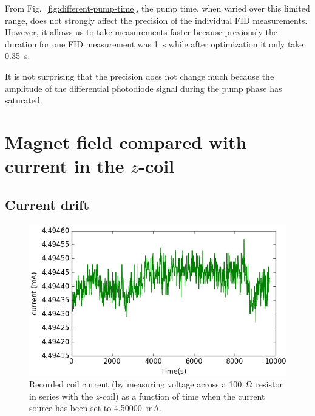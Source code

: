 From Fig.~\ref{fig:different-pump-time}, the pump time, when varied
over this limited range, does not strongly affect the precision of the
individual FID measurements.  However, it allows us to take
measurements faster because previously the duration for one FID
measurement was 1~s while after optimization it only take 0.35~s.

It is not surprising that the precision does not change much because
the amplitude of the differential photodiode signal during the pump
phase has saturated.



\section{Magnet field compared with current in the $z$-coil}

\subsection{Current drift\label{sec:current-drift}}

\begin{figure}%
\centering
\includegraphics[width=0.7\linewidth]{figures/current}
\caption{Recorded coil current (by measuring voltage across a
  100~$\ohm$ resistor in series with the $z$-coil) as a function of
  time when the current source has been set to
  4.50000~mA.\label{fig:current}}
\end{figure}

